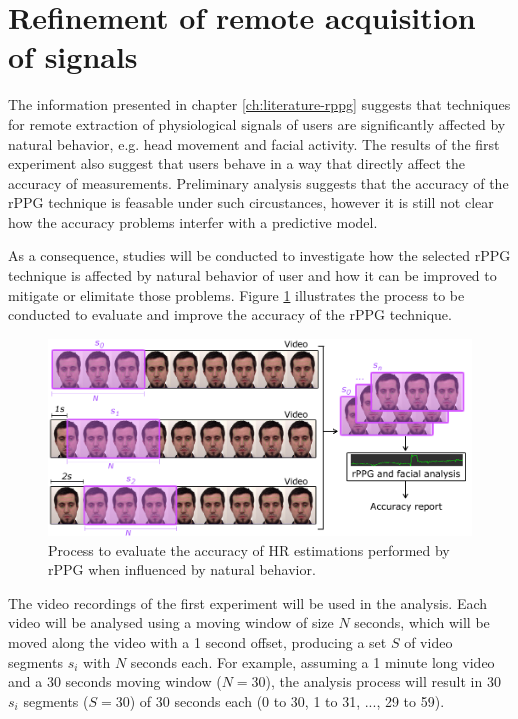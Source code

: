 \section{Refinement of remote acquisition of signals}
\label{sec:closing-refinement}

The information presented in chapter \ref{ch:literature-rppg} suggests that techniques for remote extraction of physiological signals of users are significantly affected by natural behavior, e.g. head movement and facial activity. The results of the first experiment also suggest that users behave in a way that directly affect the accuracy of measurements. Preliminary analysis \parencite{bevilacqua2017accuracy} suggests that the accuracy of the rPPG technique is feasable under such circustances, however it is still not clear how the accuracy problems interfer with a predictive model.

As a consequence, studies will be conducted to investigate how the selected rPPG technique is affected by natural behavior of user and how it can be improved to mitigate or elimitate those problems. Figure \ref{fig:rppg-accuracy-study} illustrates the process to be conducted to evaluate and improve the accuracy of the rPPG technique.

\begin{figure}[h]
    \centering
    \includegraphics[width=\textwidth]{figures/rppg-accuracy-study}
    \caption{Process to evaluate the accuracy of HR estimations performed by rPPG when influenced by natural behavior.}
    \label{fig:rppg-accuracy-study}
\end{figure}

The video recordings of the first experiment will be used in the analysis. Each video will be analysed using a moving window of size $N$ seconds, which will be moved along the video with a 1 second offset, producing a set $S$ of video segments $s_i$ with $N$ seconds each. For example, assuming a 1 minute long video and a 30 seconds moving window ($N=30$), the analysis process will result in 30 $s_i$ segments ($S=30$) of 30 seconds each (0 to 30, 1 to 31, ..., 29 to 59).

